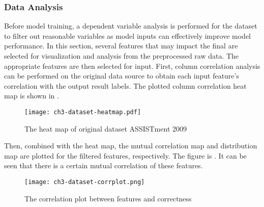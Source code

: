 \subsubsection{Data Analysis}
Before model training, a dependent variable analysis is performed for the dataset to filter out reasonable variables as model inputs can effectively improve model performance. In this section, several features that may impact the final are selected for visualization and analysis from the preprocessed raw data. The appropriate features are then selected for input.
First, column correlation analysis can be performed on the original data source to obtain each input feature's correlation with the output result labels. The plotted column correlation heat map is shown in \figname{\ref{fig:ch3-dataset-heatmap}}.

\begin{figure}[htb]
    \centering
    \texttt{[image: ch3-dataset-heatmap.pdf]}
    \caption{The heat map of original dataset ASSISTment 2009}\label{fig:ch3-dataset-heatmap}
\end{figure}

Then, combined with the heat map, the mutual correlation map and distribution map are plotted for the filtered features, respectively. The figure is \figname{\ref{fig:ch3-dataset-corrplot}}. It can be seen that there is a certain mutual correlation of these features.
\begin{figure}[htbp!]
    \centering
    \texttt{[image: ch3-dataset-corrplot.png]}
    \caption{The correlation plot between features and correctness}\label{fig:ch3-dataset-corrplot}
\end{figure}


